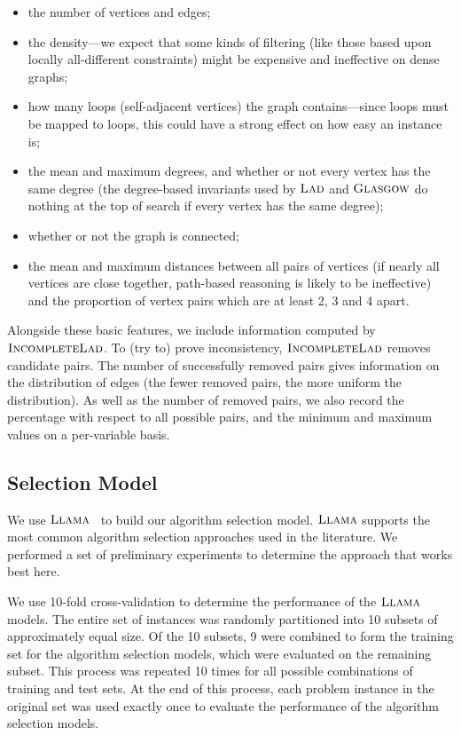 \documentclass{llncs}
\newcommand{\Glasgow}{$\textsc{Glasgow}$\xspace}
\newcommand{\LAD}{$\textsc{Lad}$\xspace}
\newcommand{\IncompleteLAD}{$\textsc{IncompleteLad}$\xspace}
\newcommand{\LLAMA}{$\textsc{Llama}$\xspace}
\begin{document}
\begin{itemize}
    \item the number of vertices and edges;
    \item the density---we expect that some kinds of filtering (like those based upon locally
        all-different constraints) might be expensive and ineffective on
        dense graphs;
    \item how many loops (self-adjacent vertices) the graph contains---since loops must be mapped to
        loops, this could have a strong effect on how easy an instance is;
    \item the mean and maximum degrees, and whether or not every vertex has the same degree (the
        degree-based invariants used by \LAD and \Glasgow do nothing at the top of search if every
        vertex has the same degree);
    \item whether or not the graph is connected;
    \item the mean and maximum distances between all pairs of vertices (if nearly all vertices are
        close together, path-based reasoning is likely to be ineffective) and
        the proportion of vertex pairs which are at least 2, 3 and 4 apart.
\end{itemize}

Alongside these basic features, we include information computed by \IncompleteLAD. To (try to) prove
inconsistency, \IncompleteLAD removes candidate pairs. The number of successfully removed pairs
gives information on the distribution of edges (the fewer removed pairs, the more uniform the
distribution). As well as the number of removed pairs, we also record the percentage with respect to
all possible pairs, and the minimum and maximum values on a per-variable basis.

\subsection{Selection Model}

We use \LLAMA~\cite{kotthoff_llama_2013} to build our algorithm selection model.
\LLAMA supports the most common algorithm selection approaches used in the literature. We performed a
set of preliminary experiments to determine the approach that works best here.

We use 10-fold cross-validation to determine the performance of the \LLAMA models. The entire set of
instances was randomly partitioned into 10 subsets of approximately equal size. Of the 10 subsets, 9
were combined to form the training set for the algorithm selection models, which were evaluated on
the remaining subset. This process was repeated 10 times for all possible combinations of training
and test sets. At the end of this process, each problem instance in the original set was used
exactly once to evaluate the performance of the algorithm selection models.
\end{document}
